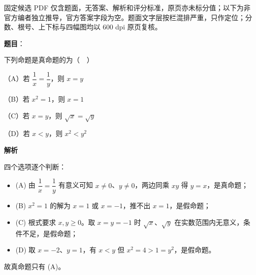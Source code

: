 

\begin{gktip}
固定候选 PDF 仅含题面，无答案、解析和评分标准，原页亦未标分值；以下为非官方编者独立推导，官方答案字段为空。题面文字层按栏混排严重，只作定位；分数、根号、上下标与四幅图均以 600 dpi 原页复核。
\end{gktip}

\begin{answer}

\textbf{题目}：

下列命题是真命题的为（　）

（A）若 $\dfrac1x=\dfrac1y$，则 $x=y$

（B）若 $x^2=1$，则 $x=1$

（C）若 $x=y$，则 $\sqrt x=\sqrt y$

（D）若 $x<y$，则 $x^2<y^2$

\textbf{解析}

四个选项逐个判断：

\begin{itemize}
\item (A) 由 $\dfrac1x=\dfrac1y$ 有意义可知 $x\neq0$、$y\neq0$，两边同乘 $xy$ 得 $y=x$，是真命题；
\item (B) $x^2=1$ 的解为 $x=1$ 或 $x=-1$，推不出 $x=1$，是假命题；
\item (C) 根式要求 $x,y\geqslant0$。取 $x=y=-1$ 时 $\sqrt x$、$\sqrt y$ 在实数范围内无意义，条件不足，是假命题；
\item (D) 取 $x=-2$、$y=1$，有 $x<y$ 但 $x^2=4>1=y^2$，是假命题。
\end{itemize}

故真命题只有 (A)。


\end{answer}
